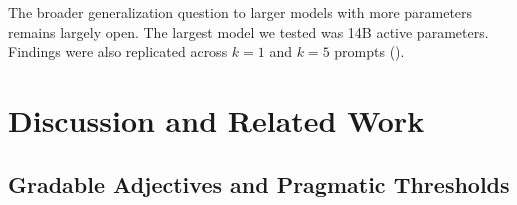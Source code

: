 \documentclass{article}
\newcommand{\primalz}{\ensuremath{d_{z}}}
\begin{document}
The broader generalization question to larger models with more parameters remains largely open. The largest model we tested was 14B active parameters.
Findings were also replicated across $k = 1$ and $k = 5$ prompts ().

\section{Discussion and Related Work}
\label{sec:discussion-related-work}
\label{sec:related-work}




%


\subsection{Gradable Adjectives and Pragmatic Thresholds}
\label{subsec:related-gradability}
\end{document}
